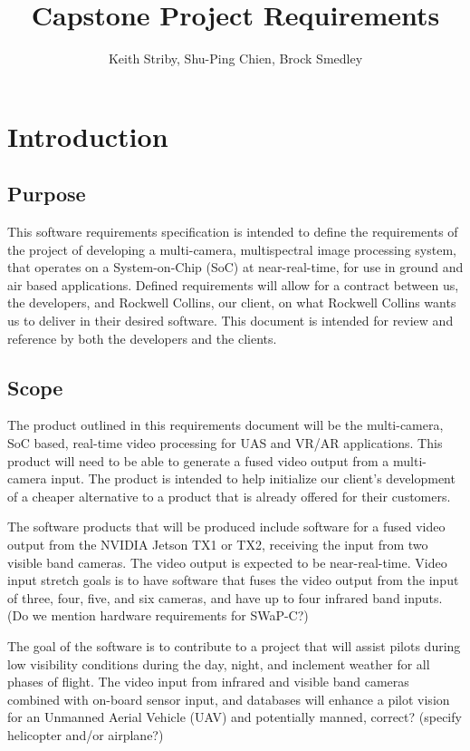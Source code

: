 \documentclass[]{report}
\title{Capstone Project Requirements}
\author{Keith Striby, Shu-Ping Chien, Brock Smedley}
\begin{document}
\maketitle

\section{Introduction}

\subsection{Purpose}
This software requirements specification is intended to define the requirements of the project of developing a multi-camera, multispectral image processing system, that operates on a System-on-Chip (SoC) at near-real-time, for use in ground and air based applications. Defined requirements will allow for a contract between us, the developers, and Rockwell Collins, our client, on what Rockwell Collins wants us to deliver in their desired software. This document is intended for review and reference by both the developers and the clients.

\subsection{Scope}
The product outlined in this requirements document will be the multi-camera, SoC based, real-time video processing for UAS and VR/AR applications. This product will need to be able to generate a fused video output from a multi-camera input. The product is intended to help initialize our client’s development of a cheaper alternative to a product that is already offered for their customers.

The software products that will be produced include software for a fused video output from the NVIDIA Jetson TX1 or TX2, receiving the input from two visible band cameras. The video output is expected to be near-real-time. Video input stretch goals is to have software that fuses the video output from the input of three, four, five, and six cameras, and have up to four infrared band inputs. (Do we mention hardware requirements for SWaP-C?)

The goal of the software is to contribute to a project that will assist pilots during low visibility conditions during the day, night, and inclement weather for all phases of flight. The video input from infrared and visible band cameras combined with on-board sensor input, and databases will enhance a pilot vision for an Unmanned Aerial Vehicle (UAV) and potentially manned, correct? (specify helicopter and/or airplane?)
\end{document}
